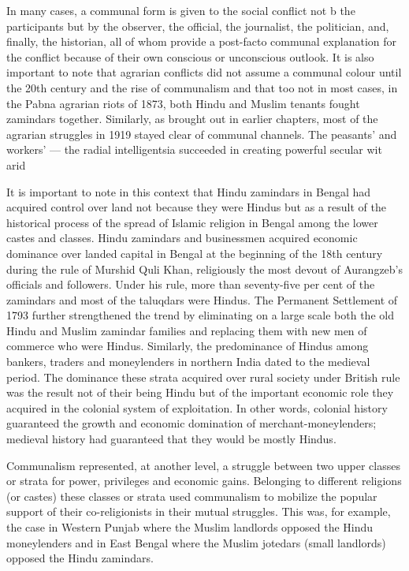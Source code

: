 \begin{multicols}{2}
In many cases, a communal form is given to the social conflict not b the participants but by the observer, the official, the journalist, the politician, and, finally, the historian, all of whom provide a post-facto communal explanation for the conflict because of their own conscious or unconscious outlook. It is also important to note that agrarian conflicts did not assume a communal colour until the 20th century and the rise of communalism and that too not in most cases, in the Pabna agrarian riots of 1873, both Hindu and Muslim tenants fought zamindars together. Similarly, as brought out in earlier chapters, most of the agrarian struggles in 1919 stayed clear of communal channels. The peasants' and workers' --- the radial intelligentsia succeeded in creating powerful secular wit arid %

It is important to note in this context that Hindu zamindars in Bengal had acquired control over land not because they were Hindus but as a result of the historical process of the spread of Islamic religion in Bengal among the lower castes and classes. Hindu zamindars and businessmen acquired economic dominance over landed capital in Bengal at the beginning of the 18th century during the rule of Murshid Quli Khan, religiously the most devout of Aurangzeb's officials and followers. Under his rule, more than seventy-five per cent of the zamindars and most of the taluqdars were Hindus. The Permanent Settlement of 1793 further strengthened the trend by eliminating on a large scale both the old Hindu and Muslim zamindar families and replacing them with new men of commerce who were Hindus. Similarly, the predominance of Hindus among bankers, traders and moneylenders in northern India dated to the medieval period. The dominance these strata acquired over rural society under British rule was the result not of their being Hindu but of the important economic role they acquired in the colonial system of exploitation. In other words, colonial history guaranteed the growth and economic domination of merchant-moneylenders; medieval history had guaranteed that they would be mostly Hindus. 

Communalism represented, at another level, a struggle between two upper classes or strata for power, privileges and economic gains. Belonging to different religions (or castes) these classes or strata used communalism to mobilize the popular support of their co-religionists in their mutual struggles. This was, for example, the case in Western Punjab where the Muslim landlords opposed the Hindu moneylenders and in East Bengal where the Muslim jotedars (small landlords) opposed the Hindu zamindars.


\end{multicols}
